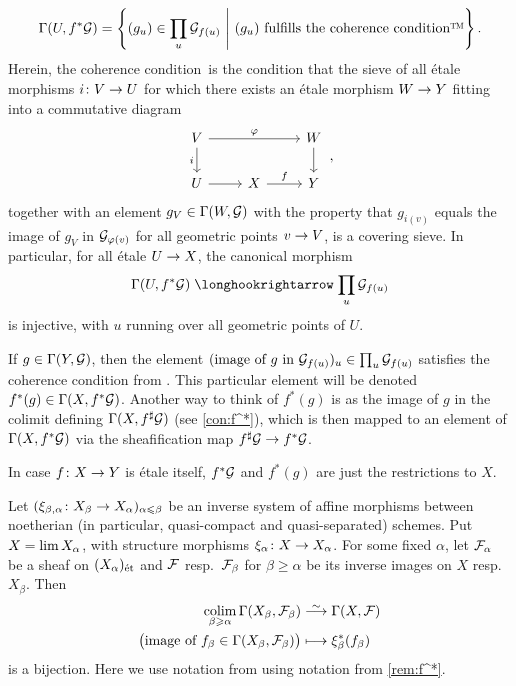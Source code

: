 \documentclass[a4paper, 10pt, oneside, DIV=9, chapterprefix=true, numbers=enddot, bibliography=totoc]{scrbook}
\begin{document}
\begin{rem}
\begin{alphanumerate}
		\begin{equation*}
			\Gamma(U,f^*\Gg)=\left\{(g_u)\in\prod_{u}\Gg_{f(u)}\st(g_u)\text{ fulfills the coherence condition\texttrademark}\right\}.
		\end{equation*}
		Herein, the coherence condition\texttrademark\ is the condition that the sieve of all étale morphisms $i\colon V\morphism U$ for which there exists an étale morphism $W\morphism Y$ fitting into a commutative diagram
		\begin{equation*}
			\begin{tikzcd}
				V\dar["i"']\ar[rr, "\phi"] & & W\dar\\
				U \rar& X\rar["f"] & Y 
			\end{tikzcd}\,,
		\end{equation*}
		together with an element $g_V\in \operatorname{\Gamma}(W,\mathcal{G})$ with the property that $g_{i(v)}$ equals the image of $g_V$ in $\mathcal{G}_{\varphi(v)}$ for all geometric points $v\morphism V$, is a covering sieve. In particular, for all étale $U\morphism X$, the canonical morphism
		\begin{equation*}
		\Global(U,f^*\Gg)\monomorphism \prod_{u}\Gg_{f(u)}
		\end{equation*}
		is injective, with $u$ running over all geometric points of $U$.
		\item If $g\in\operatorname{\Gamma}(Y,\mathcal{G})$, then the element $(\text{image of $g$ in $\mathcal{G}_{f(u)}$})_u\in\prod_u\mathcal{G}_{f(u)}$ satisfies the coherence condition from . This particular element will be denoted $f^*(g)\in \operatorname{\Gamma}(X,f^*\mathcal{G})$. Another way to think of $f^*(g)$ is as the image of $g$ in the colimit defining $\operatorname{\Gamma}(X,f^\sharp\mathcal{G})$ (see \cref{con:f^*}), which is then mapped to an element of $\operatorname{\Gamma}(X,f^*\mathcal{G})$ via the sheafification map $f^\sharp\Gg\morphism f^*\Gg$.
		\item In case $f\colon X\morphism Y$ is étale itself, $f^*\mathcal{G}$ and $f^*(g)$ are just the restrictions to $X$.
	\end{alphanumerate}
\end{rem}
\begin{prop}\label{prop:etaleInverseLimit}
	Let $(\xi_{\beta,\alpha}\colon X_\beta\morphism X_\alpha)_{\alpha\leq \beta}$ be an inverse system of affine morphisms between noetherian (in particular, quasi-compact and quasi-separated) schemes. Put $X=\operatorname*{lim} X_\alpha$, with structure morphisms $\xi_\alpha\colon X\morphism X_\alpha$. For some fixed $\alpha$, let $\mathcal{F}_\alpha$ be a sheaf on $(X_\alpha)_{\mathrm{\acute{e}t}}$ and $\mathcal{F}$ resp.\ $\mathcal{F}_\beta$ for $\beta\geq \alpha$ be its inverse images on $X$ resp.\ $X_\beta$. Then
	\begin{align*}
		\colimit_{\beta\geq \alpha}\Global(X_\beta,\Ff_\beta)&\isomorphism \Global(X,\Ff)\\
		\big(\text{image of }f_\beta\in\Global(X_\beta,\Ff_\beta)\big)&\longmapsto \xi_\beta^*(f_\beta)
	\end{align*}
	is a bijection. Here we use notation from using notation from \cref{rem:f^*}.
\end{prop}
\end{document}
